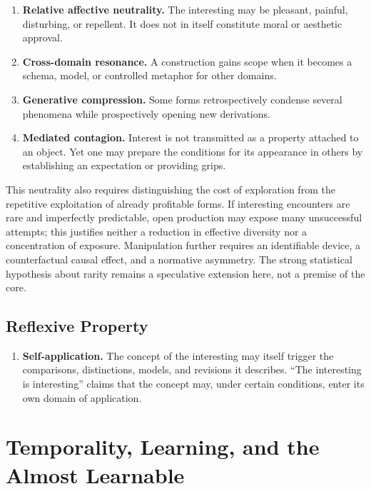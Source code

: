\documentclass[11pt,a4paper]{article}
\begin{document}
\begin{enumerate}[resume]
  \item \textbf{Relative affective neutrality.} The interesting may be
        pleasant, painful, disturbing, or repellent. It does not in itself
        constitute moral or aesthetic approval.
  \item \textbf{Cross-domain resonance.} A construction gains scope when it
        becomes a schema, model, or controlled metaphor for other domains.
  \item \textbf{Generative compression.} Some forms retrospectively condense
        several phenomena while prospectively opening new derivations.
  \item \textbf{Mediated contagion.} Interest is not transmitted as a property
        attached to an object. Yet one may prepare the conditions for its
        appearance in others by establishing an expectation or providing
        grips.
\end{enumerate}

This neutrality also requires distinguishing the cost of exploration from the
repetitive exploitation of already profitable forms. If interesting encounters
are rare and imperfectly predictable, open production may expose many
unsuccessful attempts; this justifies neither a reduction in effective diversity
nor a concentration of exposure. Manipulation further requires an identifiable
device, a counterfactual causal effect, and a normative asymmetry. The strong
statistical hypothesis about rarity remains a speculative extension here, not a
premise of the core.

\subsection{Reflexive Property}

\begin{enumerate}[resume]
  \item \textbf{Self-application.} The concept of the interesting may itself
        trigger the comparisons, distinctions, models, and revisions it
        describes. ``The interesting is interesting'' claims that the concept
        may, under certain conditions, enter its own domain of application.
\end{enumerate}

\section{Temporality, Learning, and the Almost Learnable}
\end{document}
